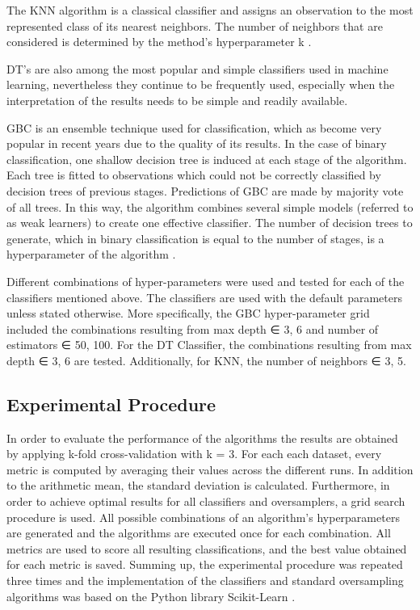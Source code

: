 \documentclass[parskip=full]{scrartcl}
\begin{document}
The KNN algorithm is a classical classifier and assigns an observation to the 
most represented class of its nearest neighbors. The number of neighbors that 
are considered is determined by the method’s hyperparameter k \cite{Fix1989}. 

DT’s \cite{Breiman1984} are also among the most popular and simple classifiers 
used in machine learning, nevertheless they continue to be frequently used, 
especially when the interpretation of the results needs to be simple and 
readily available. 

GBC is an ensemble technique used for classification, which as become very 
popular in recent years due to the quality of its results. In the case of 
binary classification, one shallow decision tree is induced at each stage of 
the algorithm. Each tree is fitted to observations which could not be correctly 
classified by decision trees of previous stages. Predictions of GBC are made by 
majority vote of all trees. In this way, the algorithm combines several simple 
models (referred to as weak learners) to create one effective classifier. The 
number of decision trees to generate, which in binary classification is equal 
to the number of stages, is a hyperparameter of the algorithm 
\cite{Friedman2001}.

Different combinations of hyper-parameters were used and tested for each of the 
classifiers mentioned above. The classifiers are used with the default 
parameters unless stated otherwise. More specifically, the GBC hyper-parameter 
grid included the combinations resulting from max depth ∈ {3, 6} and number of 
estimators ∈ {50, 100}. For the DT Classifier, the combinations resulting from 
max depth ∈ {3, 6} are tested. Additionally, for KNN, the number of neighbors ∈ 
{3, 5}.

\subsection{Experimental Procedure}

In order to evaluate the performance of the algorithms the results are obtained 
by applying k-fold cross-validation with k = 3. For each each dataset, every 
metric is computed by averaging their values across the different runs. In 
addition to the arithmetic mean, the standard deviation is calculated. 
Furthermore, in order to achieve optimal results for all classifiers and 
oversamplers, a grid search procedure is used. All possible combinations of an 
algorithm’s hyperparameters are generated and the algorithms are executed once 
for each combination. All metrics are used to score all resulting 
classifications, and the best value obtained for each metric is saved. Summing 
up, the experimental procedure was repeated three times and the implementation 
of the classifiers and standard oversampling algorithms was based on the Python 
library Scikit-Learn \cite{Pedregosa2011}. 
\end{document}
